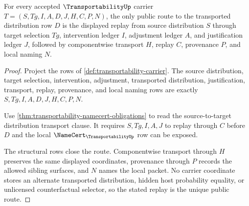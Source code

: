 \begin{theorem}
\label{thm:transportability-source-target-replay}
For every accepted $\TransportabilityUp$ carrier $T=(S,Tg,I,A,D,J,H,C,P,N)$, the only public route to the transported distribution row $D$ is the displayed replay from source distribution $S$ through target selection $Tg$, intervention ledger $I$, adjustment ledger $A$, and justification ledger $J$, followed by componentwise transport $H$, replay $C$, provenance $P$, and local naming $N$.
\end{theorem}
\begin{proof}
Project the rows of \autoref{def:transportability-carrier}. The source distribution, target selection, intervention, adjustment, transported distribution, justification, transport, replay, provenance, and local naming rows are exactly $S,Tg,I,A,D,J,H,C,P,N$.

Use \autoref{thm:transportability-namecert-obligations} to read the source-to-target distribution transport clause. It requires $S,Tg,I,A,J$ to replay through $C$ before $D$ and the local $\NameCert_{\TransportabilityUp}$ row can be exposed.

The structural rows close the route. Componentwise transport through $H$ preserves the same displayed coordinates, provenance through $P$ records the allowed sibling surfaces, and $N$ names the local packet. No carrier coordinate stores an alternate transported distribution, hidden host probability equality, or unlicensed counterfactual selector, so the stated replay is the unique public route.
\end{proof}

